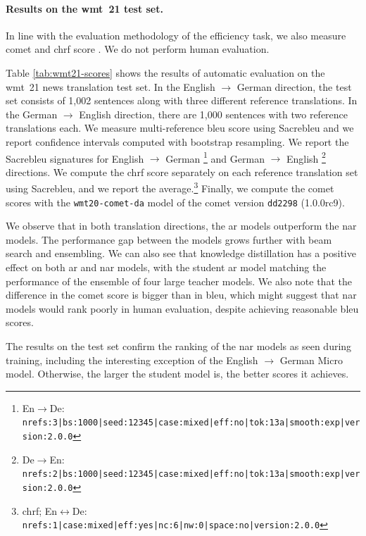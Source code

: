 \paragraph{Results on the \acs{wmt}~21 test set.}
In line with the evaluation methodology of the efficiency task, we also measure
\acs{comet} \citep{rei-etal-2020-comet} and \acs{chrf} score
\citep{popovic-2015-chrf}. We do not perform human evaluation.

Table \ref{tab:wmt21-scores} shows the results of automatic evaluation
on the \acs{wmt}~21 news translation test set. In the English $\rightarrow$
German direction, the test set consists of 1,002 sentences along with three
different reference translations. In the German $\rightarrow$ English
direction, there are 1,000 sentences with two reference translations each. We
measure multi-reference \acs{bleu} score using Sacrebleu \citep{post-2018-call}
and we report confidence intervals computed with bootstrap resampling. We
report the Sacrebleu signatures for English $\rightarrow$ German%
\footnote{En$\rightarrow$De: {\scriptsize
    \texttt{nrefs:3|bs:1000|seed:12345|case:mixed|eff:no|tok:13a|smooth:exp|version:2.0.0}}}
and German $\rightarrow$ English%
\footnote{De$\rightarrow$En: {\scriptsize
    \texttt{nrefs:2|bs:1000|seed:12345|case:mixed|eff:no|tok:13a|smooth:exp|version:2.0.0}}}
directions. We compute the \acs{chrf} score separately on each reference
translation set using Sacrebleu, and we report the
average.\footnote{\acs{chrf}; En$\leftrightarrow$De: {\scriptsize
    \texttt{nrefs:1|case:mixed|eff:yes|nc:6|nw:0|space:no|version:2.0.0}}}
Finally, we compute the \acs{comet} scores with the \texttt{wmt20-comet-da}
model of the \acs{comet} version \texttt{dd2298} (1.0.0rc9).

We observe that in both translation directions, the \ac{ar} models outperform
the \ac{nar} models. The performance gap between the models grows further with
beam search and ensembling. We can also see that knowledge distillation has a
positive effect on both \ac{ar} and \ac{nar} models, with the student \ac{ar}
model matching the performance of the ensemble of four large teacher models.
We also note that the difference in the \acs{comet} score is bigger than in
\acs{bleu}, which might suggest that \acs{nar} models would rank poorly in
human evaluation, despite achieving reasonable \acs{bleu} scores.

The results on the test set confirm the ranking of the \acs{nar} models as seen
during training, including the interesting exception of the
English $\rightarrow$ German Micro model. Otherwise, the larger the student
model is, the better scores it achieves.

